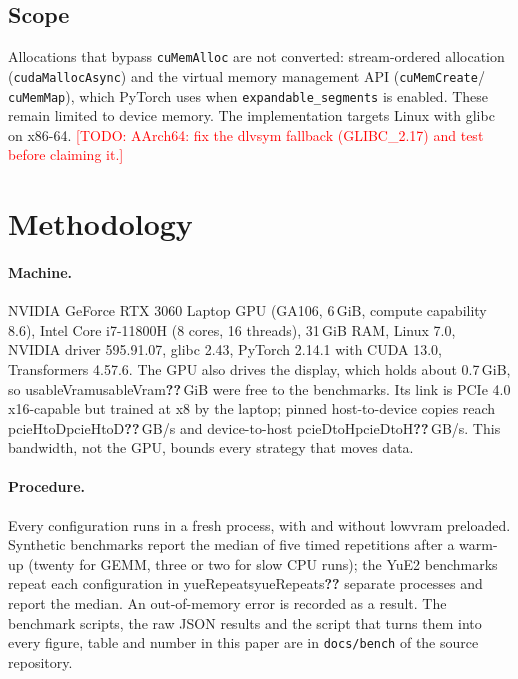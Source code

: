 \documentclass[11pt]{article}
\providecommand{\na}{\textbf{??}}
\newcommand{\num}[1]{\ifcsname #1\endcsname\csname #1\endcsname\else\na\fi}
\newcommand{\todo}[1]{\textcolor{red}{[TODO: #1]}}
\begin{document}
\subsection{Scope}
Allocations that bypass \texttt{cuMemAlloc} are not converted: stream-ordered allocation
(\texttt{cudaMallocAsync}) and the virtual memory management API (\texttt{cuMemCreate}/
\texttt{cuMemMap}), which PyTorch uses when \texttt{expandable\_segments} is enabled. These remain
limited to device memory. The implementation targets Linux with glibc on x86-64.
\todo{AArch64: fix the dlvsym fallback (GLIBC\_2.17) and test before claiming it.}

\section{Methodology}
\label{sec:method}

\paragraph{Machine.} NVIDIA GeForce RTX 3060 Laptop GPU (GA106, 6\,GiB, compute capability 8.6),
Intel Core i7-11800H (8 cores, 16 threads), 31\,GiB RAM, Linux 7.0, NVIDIA driver 595.91.07,
glibc 2.43, PyTorch 2.14.1 with CUDA 13.0, Transformers 4.57.6. The GPU also drives the
display, which holds about 0.7\,GiB, so \num{usableVram}\,GiB were free to the benchmarks. Its link
is PCIe 4.0 x16-capable but trained at x8 by the laptop; pinned host-to-device copies reach
\num{pcieHtoD}\,GB/s and device-to-host \num{pcieDtoH}\,GB/s. This bandwidth, not the GPU,
bounds every strategy that moves data.

\paragraph{Procedure.} Every configuration runs in a fresh process, with and without lowvram
preloaded. Synthetic benchmarks report the median of five timed repetitions after a warm-up
(twenty for GEMM, three or two for slow CPU runs); the YuE2 benchmarks repeat each configuration
in \num{yueRepeats} separate processes and report the median. An out-of-memory error is recorded as
a result. The benchmark scripts, the raw JSON results and the script that turns them into every
figure, table and number in this paper are in \texttt{docs/bench} of the source repository.
\end{document}
